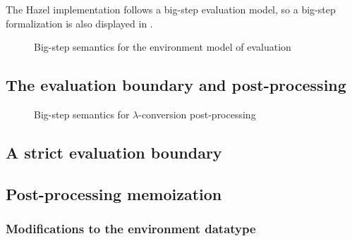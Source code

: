 The Hazel implementation follows a big-step evaluation model, so a big-step formalization is also displayed in .

\begin{figure}
  \centering
  \begin{mdframed}
    \begin{singlespace}
      
    \end{singlespace}
  \end{mdframed}
  \caption{Big-step semantics for the environment model of evaluation}
  \label{fig:big-step-formal}
\end{figure}




\subsection{The evaluation boundary and post-processing}
\label{sec:closures_to_lambdas}


\begin{figure}
  \centering
  \begin{mdframed}
    \begin{singlespace}
      
    \end{singlespace}
  \end{mdframed}
  \caption{Big-step semantics for $\lambda$-conversion post-processing}
  \label{fig:big-step-inside-formal}
\end{figure}

\subsection{A strict evaluation boundary}
\label{sec:strict_eval_boundary}

\subsection{Post-processing memoization}
\label{sec:memoization}

\subsubsection{Modifications to the environment datatype}
\label{sec:memoization-evalenv}

